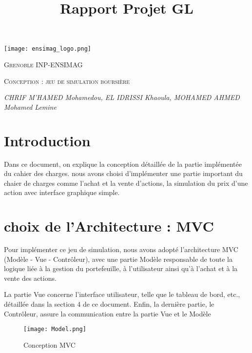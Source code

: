 \documentclass[10pt]{article}
\title{Rapport Projet GL}
\date{}
\author{}
\begin{document}
\large
\begin{titlepage}
    \centering
    \begin{minipage}{0.5\textwidth}

        \centering
        \texttt{[image: ensimag\_logo.png]}

    \end{minipage}%

    
    {\scshape\LARGE Grenoble INP-ENSIMAG  \par}
    \vspace{4cm}
    {\scshape\Large  Conception :  jeu de simulation boursière \par}
    \vspace{8cm}
    {\Large\itshape CHRIF M'HAMED Mohamedou, EL IDRISSI Khaoula, MOHAMED AHMED Mohamed Lemine
\par}


\end{titlepage}

\tableofcontents

\newpage
\section{\textbf{Introduction}}

Dans ce document, on explique la conception détaillée de la partie implémentée du cahier des charges. 
nous avons choisi d'implémenter une partie  important du chaier de charges comme l'achat et la vente d'actions, la simulation du prix d'une action avec interface graphique simple.



\section{\textbf{choix de l'Architecture : MVC}}

Pour implémenter ce jeu de simulation, nous avons adopté l'architecture MVC (Modèle - Vue - Contrôleur), avec une partie Modèle responsable de toute la logique liée à la gestion du portefeuille, à l'utilisateur ainsi qu'à l'achat et à la vente des actions.

La partie Vue concerne l'interface utilisateur, telle que le tableau de bord, etc., détaillée dans la section 4 de ce document. Enfin, la dernière partie, le Contrôleur, assure la communication entre la partie Vue et le Modèle

\newpage
\begin{figure}
 
    \texttt{[image: Model.png]}
    \caption{Conception MVC}
    \label{fig:enter-label}
\end{figure}
\end{document}
